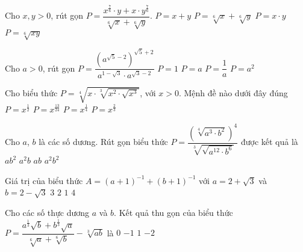 \begin{ex}%
	Cho $x,y>0$, rút gọn $P=\dfrac{x^{\tfrac{7}{6}}\cdot y+x\cdot y^{\tfrac{7}{6}}}{\sqrt[6]{x}+\sqrt[6]{y}}$. 
	\choice
	{$P=x+y$}
	{$P=\sqrt[6]{x}+\sqrt[6]{y}$}
	{\True $P=x\cdot y$}
	{$P=\sqrt[6]{xy}$}
\end{ex}
\begin{ex}%
	Cho $a>0$, rút gọn $P=\dfrac{\left(a^{\sqrt{5}-2}\right)^{\sqrt{5}+2}}{a^{1-\sqrt{3}}\cdot a^{\sqrt{3}-2}}$ 
	\choice
	{$P=1$}
	{$P=a$}
	{$P=\dfrac{1}{a}$}
	{\True $P=a^2$}
\end{ex}
\begin{ex}%
	Cho biểu thức $P=\sqrt[4]{x\cdot\sqrt[3]{x^2\cdot\sqrt{x^3}}}$, với $x>0$. Mệnh đề nào dưới đây đúng
	\choice
	{$P=x^{\tfrac{1}{2}}$}
	{\True $P=x^{\tfrac{13}{24}}$}
	{$P=x^{\tfrac{1}{4}}$}
	{$P=x^{\tfrac{2}{3}}$}
\end{ex}
\begin{ex}%
	Cho $a$, $b$ là các số dương. Rút gọn biểu thức $P=\dfrac{\left(\sqrt[4]{a^3\cdot b^2}\right)^4}{\sqrt[3]{\sqrt{a^{12}\cdot b^6}}}$ được kết quả là 
	\choice
	{$ab^2$}
	{$a^2b$}
	{\True $ab$}
	{$a^2b^2$}
\end{ex}
\begin{ex}%
	Giá trị của biểu thức $A=(a+1)^{-1}+(b+1)^{-1}$ với $a=2+\sqrt{3}$ và $b=2-\sqrt{3}$ 
	\choice
	{$3$}
	{$2$}
	{\True $1$}
	{$4$}
\end{ex}
\begin{ex}%
	Cho các số thực dương $a$ và $b$. Kết quả thu gọn của biểu thức $P=\dfrac{a^{\tfrac{1}{3}}\sqrt{b}+b^{\tfrac{1}{3}}\sqrt{a}}{\sqrt[6]{a}+\sqrt[6]{b}}-\sqrt[3]{ab}$ là
	\choice
	{\True $0$}
	{$-1$}
	{$1$}
	{$-2$}
\end{ex}
